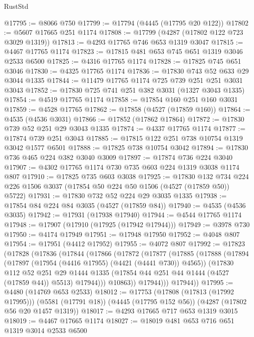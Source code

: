\begin{lexlean}{RustStd}
\begin{coremodule}
{\begin{coremodule}
{{{{{{{{{{{{{{{{{{{{{{{{{{{{{{{{{{{{{{@17795 := @8066 @750
@17799 := @17794 (@4445 (@17795 @20 @122))
@17802 := @5607 @17665 @251 @1174
@17808 := @17799 (@4287 (@17802 @122 @723 @3029 @1319))
@17813 := @4293 @17765 @746 @653 @1319 @3047
@17815 := @4467 @17765 @1174
@17823 := @17815 @481 @653 @745 @651 @1319 @3046 @2533 @6500
@17825 := @4316 @17765 @1174
@17828 := @17825 @745 @651 @3046
@17830 := @4325 @17765 @1174
@17836 := @17830 @743 @52 @633 @29 @3044 @1335
@17844 := @11479 @17765 @1174 @725 @739 @251 @251 @3031 @3043
@17852 := @17830 @725 @741 @251 @382 @3031 (@1327 @3043 @1335)
@17854 := @4519 @17765 @1174
@17858 := @17854 @160 @251 @160 @3031
@17859 := @4528 @17765
@17862 := @17858 (@4527 (@17859 @160))
@17864 := @4535 (@4536 @3031)
@17866 := @17852 (@17862 @17864)
@17872 := @17830 @739 @52 @251 @29 @3043 @1335
@17874 := @4337 @17765 @1174
@17877 := @17874 @739 @251 @3043
@17885 := @17815 @122 @251 @738 @10754 @1319 @3042 @1577 @6501
@17888 := @17825 @738 @10754 @3042
@17894 := @17830 @736 @465 @224 @382 @3040 @3009
@17897 := @17874 @736 @224 @3040
@17907 := @4302 @17765 @1174 @730 @735 @603 @224 @1319 @3038 @1174 @807
@17910 := @17825 @735 @603 @3038
@17925 := @17830
    @132
    @734
    @224
    @226
    @1506
    @3037
    (@17854 @50 @224 @50 @1506 (@4527 (@17859 @50)) @5722)
@17931 := @17830 @732 @52 @224 @29 @3035 @1335
@17938 := @17854 @84 @224 @84 @3035 (@4527 (@17859 @84))
@17940 := @4535 (@4536 @3035)
@17942 := @17931 (@17938 @17940)
@17944 := @4544 @17765 @1174
@17948 := @17907 (@17910 (@17925 (@17942 @17944)))
@17949 := @3978 @730
@17950 := @4174 @17949
@17951 := @17948 @17950
@17952 := @4048 @807
@17954 := @17951 (@4412 @17952)
@17955 := @4072 @807
@17992 := @17823
    (@17828
      (@17836
        (@17844
          (@17866
            (@17872
              (@17877
                (@17885
                  (@17888
                    (@17894
                      (@17897 (@17954 (@4416 @17955) (@4421 (@4441 @730)) @4565))
                      (@17830
                        @112
                        @52
                        @251
                        @29
                        @1444
                        @1335
                        (@17854 @44 @251 @44 @1444 (@4527 (@17859 @44)) @5513)
                        @17944)))
                  @10863))
              @17944)))
        @17944))
@17995 := @4480 (@14769 @653 @2533)
@18012 := @17753
    (@17808 (@17813 (@17992 @17995)))
    (@5581 (@17791 @18))
    (@4445 (@17795 @152 @56))
    (@4287 (@17802 @56 @20 @1457 @1319))
@18017 := @4293 @17665 @717 @653 @1319 @3015
@18019 := @4467 @17665 @1174
@18027 := @18019 @481 @653 @716 @651 @1319 @3014 @2533 @6500
}}}}}}}}}}}}}}}}}}}}}}}}}}}}}}}}}}}}}}
\end{coremodule}}
\end{coremodule}
\end{lexlean}
